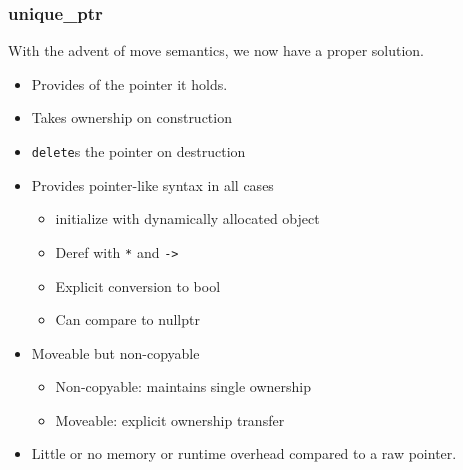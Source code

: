 \begin{frame}[fragile]
\frametitle{unique\_ptr}

With the advent of move semantics, we now have a proper solution.


\begin{itemize}
\item Provides  of the pointer it holds.
\item Takes ownership on construction
\item \texttt{delete}s the pointer on destruction
\item Provides pointer-like syntax in all cases
\begin{itemize}
  \item initialize with dynamically allocated object
  \item Deref with \texttt{*} and \texttt{->}
  \item Explicit conversion to bool
  \item Can compare to nullptr
\end{itemize}
\item Moveable but non-copyable
\begin{itemize}
  \item Non-copyable: maintains single ownership
  \item Moveable: explicit ownership transfer
\end{itemize}
\item Little or no memory or runtime overhead compared to a raw pointer.
\end{itemize}

\end{frame}


